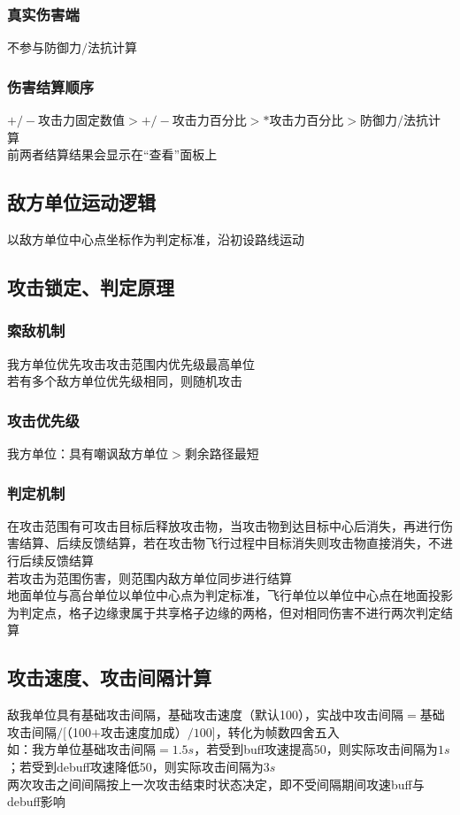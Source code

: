 \documentclass[a4paper, 12pt]{article}
\begin{document}
			\subsubsection{真实伤害端}
				不参与防御力$/$法抗计算
			\subsubsection{伤害结算顺序}
				$+/-$攻击力固定数值$>+/-$攻击力百分比$>*$攻击力百分比$>$防御力$/$法抗计算\\
				\indent 前两者结算结果会显示在“查看”面板上
		\subsection{敌方单位运动逻辑}
			以敌方单位中心点坐标作为判定标准，沿初设路线运动
		\subsection{攻击锁定、判定原理}
			\subsubsection{索敌机制}
				我方单位优先攻击攻击范围内优先级最高单位\\
				\indent 若有多个敌方单位优先级相同，则随机攻击\\
			\subsubsection{攻击优先级}
				我方单位：具有嘲讽敌方单位$>$剩余路径最短\\
			\subsubsection{判定机制}
				在攻击范围有可攻击目标后释放攻击物，当攻击物到达目标中心后消失，再进行伤害结算、后续反馈结算，若在攻击物飞行过程中目标消失则攻击物直接消失，不进行后续反馈结算\\
				\indent 若攻击为范围伤害，则范围内敌方单位同步进行结算\\
				\indent 地面单位与高台单位以单位中心点为判定标准，飞行单位以单位中心点在地面投影为判定点，格子边缘隶属于共享格子边缘的两格，但对相同伤害不进行两次判定结算
		\subsection{攻击速度、攻击间隔计算}
			敌我单位具有基础攻击间隔，基础攻击速度（默认100），实战中攻击间隔$=$基础攻击间隔$/$[（100$+$攻击速度加成）$/100$]，转化为帧数四舍五入\\
			\indent 如：我方单位基础攻击间隔$=1.5s$，若受到buff攻速提高50，则实际攻击间隔为$1s$；若受到debuff攻速降低50，则实际攻击间隔为$3s$\\
			\indent 两次攻击之间间隔按上一次攻击结束时状态决定，即不受间隔期间攻速buff与debuff影响
\end{document}
